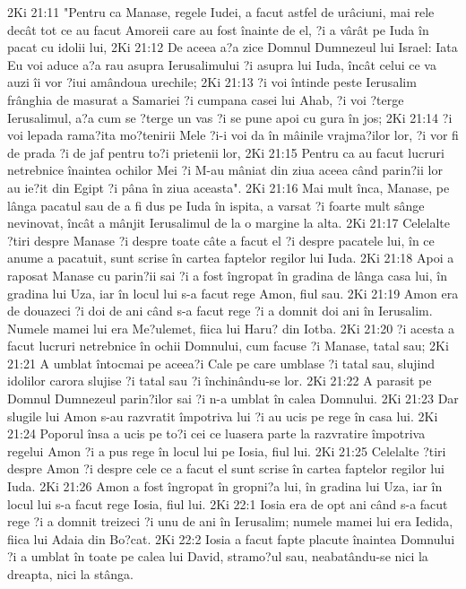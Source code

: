2Ki 21:11  "Pentru ca Manase, regele Iudei, a facut astfel de urâciuni, mai rele decât tot ce au facut Amoreii care au fost înainte de el, ?i a vârât pe Iuda în pacat cu idolii lui,
2Ki 21:12  De aceea a?a zice Domnul Dumnezeul lui Israel: Iata Eu voi aduce a?a rau asupra Ierusalimului ?i asupra lui Iuda, încât celui ce va auzi îi vor ?iui amândoua urechile;
2Ki 21:13  ?i voi întinde peste Ierusalim frânghia de masurat a Samariei ?i cumpana casei lui Ahab, ?i voi ?terge Ierusalimul, a?a cum se ?terge un vas ?i se pune apoi cu gura în jos;
2Ki 21:14  ?i voi lepada rama?ita mo?tenirii Mele ?i-i voi da în mâinile vrajma?ilor lor, ?i vor fi de prada ?i de jaf pentru to?i prietenii lor,
2Ki 21:15  Pentru ca au facut lucruri netrebnice înaintea ochilor Mei ?i M-au mâniat din ziua aceea când parin?ii lor au ie?it din Egipt ?i pâna în ziua aceasta".
2Ki 21:16  Mai mult înca, Manase, pe lânga pacatul sau de a fi dus pe Iuda în ispita, a varsat ?i foarte mult sânge nevinovat, încât a mânjit Ierusalimul de la o margine la alta.
2Ki 21:17  Celelalte ?tiri despre Manase ?i despre toate câte a facut el ?i despre pacatele lui, în ce anume a pacatuit, sunt scrise în cartea faptelor regilor lui Iuda.
2Ki 21:18  Apoi a raposat Manase cu parin?ii sai ?i a fost îngropat în gradina de lânga casa lui, în gradina lui Uza, iar în locul lui s-a facut rege Amon, fiul sau.
2Ki 21:19  Amon era de douazeci ?i doi de ani când s-a facut rege ?i a domnit doi ani în Ierusalim. Numele mamei lui era Me?ulemet, fiica lui Haru? din Iotba.
2Ki 21:20  ?i acesta a facut lucruri netrebnice în ochii Domnului, cum facuse ?i Manase, tatal sau;
2Ki 21:21  A umblat întocmai pe aceea?i Cale pe care umblase ?i tatal sau, slujind idolilor carora slujise ?i tatal sau ?i închinându-se lor.
2Ki 21:22  A parasit pe Domnul Dumnezeul parin?ilor sai ?i n-a umblat în calea Domnului.
2Ki 21:23  Dar slugile lui Amon s-au razvratit împotriva lui ?i au ucis pe rege în casa lui.
2Ki 21:24  Poporul însa a ucis pe to?i cei ce luasera parte la razvratire împotriva regelui Amon ?i a pus rege în locul lui pe Iosia, fiul lui.
2Ki 21:25  Celelalte ?tiri despre Amon ?i despre cele ce a facut el sunt scrise în cartea faptelor regilor lui Iuda.
2Ki 21:26  Amon a fost îngropat în gropni?a lui, în gradina lui Uza, iar în locul lui s-a facut rege Iosia, fiul lui.
2Ki 22:1  Iosia era de opt ani când s-a facut rege ?i a domnit treizeci ?i unu de ani în Ierusalim; numele mamei lui era Iedida, fiica lui Adaia din Bo?cat.
2Ki 22:2  Iosia a facut fapte placute înaintea Domnului ?i a umblat în toate pe calea lui David, stramo?ul sau, neabatându-se nici la dreapta, nici la stânga.
